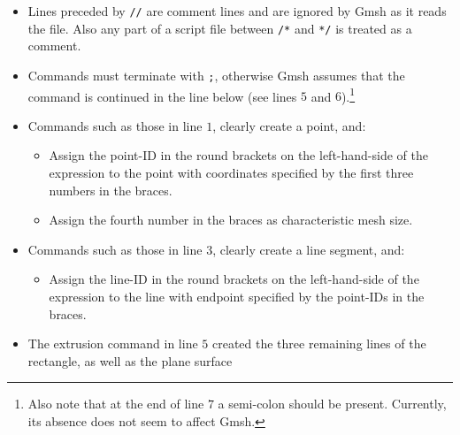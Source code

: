 \begin{itemize}
  \item Lines preceded by \verb$//$ are comment lines and are ignored by Gmsh as it reads the file.
        Also any part of a script file between \verb$/*$ and \verb$*/$ is treated as a comment.
  \item Commands must terminate with \lstinline{;}, otherwise Gmsh assumes that the command is
        continued in the line below (see lines $5$ and $6$).\footnote{Also note that at the end of line
        $7$ a semi-colon should be present. Currently, its absence does not seem to affect Gmsh.}
  \item Commands such as those in line $1$, clearly create a point, and:
  \begin{itemize}
    \item Assign the point-ID in the round brackets on the left-hand-side of the expression to the
          point with coordinates specified by the first three numbers in the braces.
    \item Assign the fourth number in the braces as characteristic mesh size.
  \end{itemize}
  \item Commands such as those in line $3$, clearly create a line segment, and:
  \begin{itemize}
    \item Assign the line-ID in the round brackets on the left-hand-side of the expression to the
          line with endpoint specified by the point-IDs in the braces.
  \end{itemize}
  \item The extrusion command in line $5$ created the three remaining lines of the rectangle, as well
        as the plane surface
\end{itemize}

